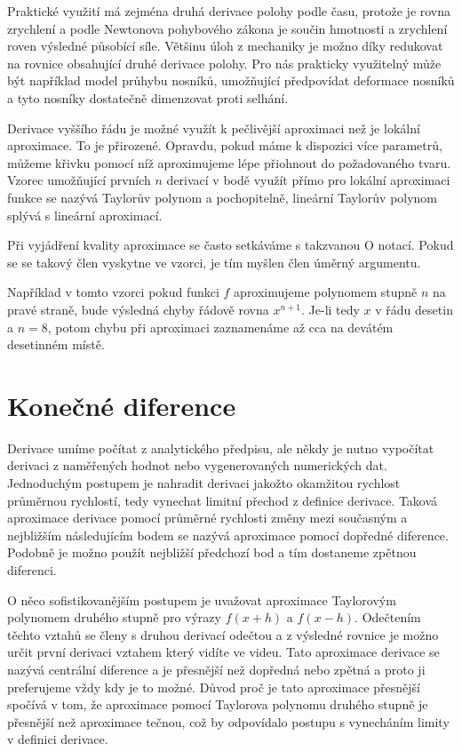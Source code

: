 \documentclass[12pt]{article}
\begin{document}
Praktické využití má zejména druhá derivace polohy podle času, protože je rovna zrychlení a podle Newtonova pohybového zákona je součin hmotnosti a zrychlení roven výsledné působící síle. Většinu úloh z mechaniky je možno díky redukovat na rovnice obsahující druhé derivace polohy. Pro nás prakticky využitelný může být například model průhybu nosníků, umožňující předpovídat deformace nosníků a tyto nosníky dostatečně dimenzovat proti selhání.  

Derivace vyššího řádu je možné využít k pečlivější aproximaci než je lokální aproximace. To je přirozené. Opravdu, pokud máme k dispozici více parametrů, můžeme křivku pomocí níž aproximujeme lépe přiohnout do požadovaného tvaru. Vzorec umožňující prvních $n$ derivací v bodě využít přímo pro lokální aproximaci funkce se nazývá Taylorův polynom a pochopitelně, lineární Taylorův polynom splývá s lineární aproximací.

Při vyjádření kvality aproximace se často setkáváme s takzvanou O notací. Pokud se se takový člen vyskytne ve vzorci, je tím myšlen člen úměrný argumentu.

Například v tomto vzorci pokud funkci $f$ aproximujeme polynomem stupně $n$ na pravé straně, bude výsledná chyby řádově rovna $x^{n+1}$. Je-li tedy $x$ v řádu desetin a $n=8$, potom chybu při aproximaci zaznamenáme až cca na devátém desetinném místě.


\section*{Konečné diference}

Derivace umíme počítat z analytického předpisu, ale někdy je nutno vypočítat derivaci z naměřených hodnot nebo vygenerovaných numerických dat. Jednoduchým postupem je nahradit derivaci jakožto okamžitou rychlost průměrnou rychlostí, tedy vynechat limitní přechod z definice derivace. Taková aproximace derivace pomocí průměrné rychlosti změny mezi současným a nejbližším následujícím bodem se nazývá aproximace pomocí dopředné diference. Podobně je možno použít nejbližší předchozí bod a tím dostaneme zpětnou diferenci.

O něco sofistikovanějším postupem je uvažovat aproximace Taylorovým polynomem druhého stupně pro výrazy $f(x+h)$ a $f(x-h)$. Odečtením těchto vztahů se členy s druhou derivací odečtou a z výsledné rovnice je možno určit první derivaci vztahem který vidíte ve videu. Tato aproximace derivace se nazývá centrální diference a je přesnější než dopředná nebo zpětná a proto ji preferujeme vždy kdy je to možné. Důvod proč je tato aproximace přesnější spočívá v tom, že aproximace pomocí Taylorova polynomu druhého stupně je přesnější než aproximace tečnou, což by odpovídalo postupu s vynecháním limity v definici derivace.
\end{document}
